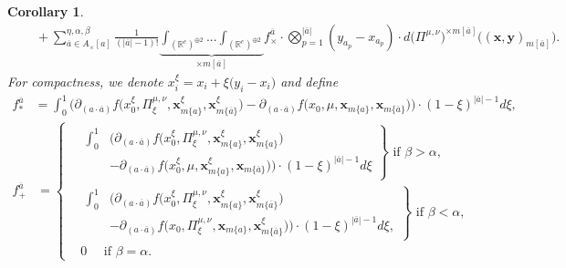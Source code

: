 \documentclass[a4paper,11pt,twoside]{article}
\numberwithin{equation}{section}
\theoremstyle{plain}
\newtheorem{corollary}[theorem]{Corollary}
\newcommand{\bR}{\mathbb{R}}
\newcommand{\1}{\mathbbm{1}}
\begin{document}
\begin{corollary}
\begin{align}
			\label{eq:corollary:LionsTaylor3:remUpper_Y}
			&\quad + \sum_{\overline{a} \in A_{\times}[a]}^{\eta, \alpha, \beta} \tfrac{1}{(|\overline{a}| - 1)!} \underbrace{ \int_{(\bR^e)^{\oplus 2}} ... \int_{(\bR^e)^{\oplus 2}} }_{\times m[\overline{a}]} f_{\times}^{\overline{a}}
			\cdot 
			\bigotimes_{p=1}^{|\overline{a}|} ( y_{a_p} - x_{a_p}) \cdot d\big( \Pi^{\mu, \nu}\big)^{\times m[\overline{a}]} \Big( (\boldsymbol{x}, \boldsymbol{y})_{m[\overline{a}]}\Big). 
		\end{align}
		For compactness, we denote $x_i^{\xi} = x_i + \xi\big( y_i - x_i \big)$ and define
		\begin{align*}
			f_{\ast}^{\overline{a}} 
			&= 
			\int_0^1 \bigg( \partial_{(a\cdot \overline{a})} f \Big(x_0^{\xi}, \Pi^{\mu, \nu}_\xi, \boldsymbol{x}_{m\{a\}}^{\xi}, \boldsymbol{x}_{m\{ \overline{a}\} }^{\xi} \Big) 
			- 
			\partial_{(a\cdot \overline{a})} f \Big(x_0, \mu, \boldsymbol{x}_{m\{a\}}, \boldsymbol{x}_{m\{ \overline{a}\}} \Big) \bigg) \cdot (1-\xi)^{|\overline{a}|-1} d\xi, 
		\end{align*}
		\begin{align*}
			f_{+}^{\overline{a}}
			&=\left\{ 
			\begin{aligned}
				&\left.
				\begin{aligned}
					\int_0^1& \bigg( \partial_{(a\cdot \overline{a})} f \Big(x_0^{\xi}, \Pi^{\mu, \nu}_\xi, \boldsymbol{x}_{m\{a\}}^{\xi}, \boldsymbol{x}_{m\{a\}}^{\xi} \Big) 
					\\
					&- \partial_{(a\cdot \overline{a})} f \Big(x_0^{\xi}, \mu, \boldsymbol{x}_{m\{a\}}^{\xi}, \boldsymbol{x}_{m\{\overline{a}\}} \Big)\bigg) \cdot (1-\xi)^{|\overline{a}|-1} d\xi
				\end{aligned} \right\} \mbox{ if $\beta>\alpha$,}
				\\
				&\left.
				\begin{aligned}
					\int_0^1& \bigg( \partial_{(a\cdot \overline{a})} f \Big(x_0^{\xi}, \Pi^{\mu, \nu}_\xi, \boldsymbol{x}_{m\{a\}}^{\xi}, \boldsymbol{x}_{m\{\overline{a}\}}^{\xi} \Big) 
					\\
					&- \partial_{(a\cdot \overline{a})} f \Big(x_0, \Pi^{\mu, \nu}_\xi, \boldsymbol{x}_{m\{a\}}, \boldsymbol{x}_{m\{\overline{a}\}}^{\xi} \Big)\bigg) \cdot (1-\xi)^{|\overline{a}|-1} d\xi,
				\end{aligned} \right\} \mbox{ if $\beta<\alpha$,}
				\\
				&0 \quad \mbox{ if $\beta=\alpha$.}
			\end{aligned}\right.
		\end{align*}

\end{corollary}
\end{document}
